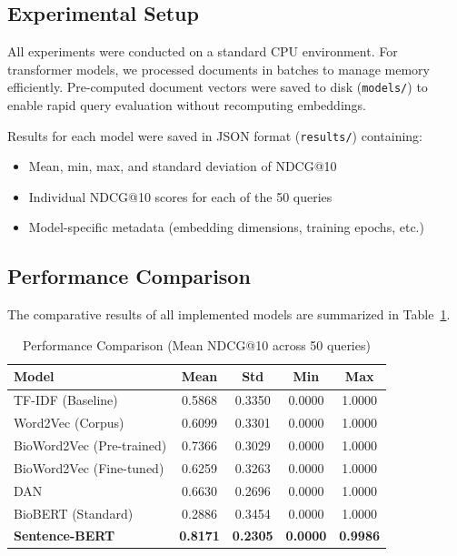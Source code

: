 \documentclass[sigconf,nonacm]{acmart}
\begin{document}
\subsection{Experimental Setup}
All experiments were conducted on a standard CPU environment. For transformer models, we processed documents in batches to manage memory efficiently. Pre-computed document vectors were saved to disk (\texttt{models/}) to enable rapid query evaluation without recomputing embeddings.

Results for each model were saved in JSON format (\texttt{results/}) containing:
\begin{itemize}
    \item Mean, min, max, and standard deviation of NDCG@10
    \item Individual NDCG@10 scores for each of the 50 queries
    \item Model-specific metadata (embedding dimensions, training epochs, etc.)
\end{itemize}

\subsection{Performance Comparison}
The comparative results of all implemented models are summarized in Table~\ref{tab:results}.

\begin{table}[h]
\caption{Performance Comparison (Mean NDCG@10 across 50 queries)}
\label{tab:results}
\centering
\small
\begin{tabular}{lcccc}
\toprule
\textbf{Model} & \textbf{Mean} & \textbf{Std} & \textbf{Min} & \textbf{Max} \\
\midrule
TF-IDF (Baseline) & 0.5868 & 0.3350 & 0.0000 & 1.0000 \\
Word2Vec (Corpus) & 0.6099 & 0.3301 & 0.0000 & 1.0000 \\
BioWord2Vec (Pre-trained) & 0.7366 & 0.3029 & 0.0000 & 1.0000 \\
BioWord2Vec (Fine-tuned) & 0.6259 & 0.3263 & 0.0000 & 1.0000 \\
DAN & 0.6630 & 0.2696 & 0.0000 & 1.0000 \\
BioBERT (Standard) & 0.2886 & 0.3454 & 0.0000 & 1.0000 \\
\textbf{Sentence-BERT} & \textbf{0.8171} & \textbf{0.2305} & \textbf{0.0000} & \textbf{0.9986} \\
\bottomrule
\end{tabular}
\end{table}
\end{document}
